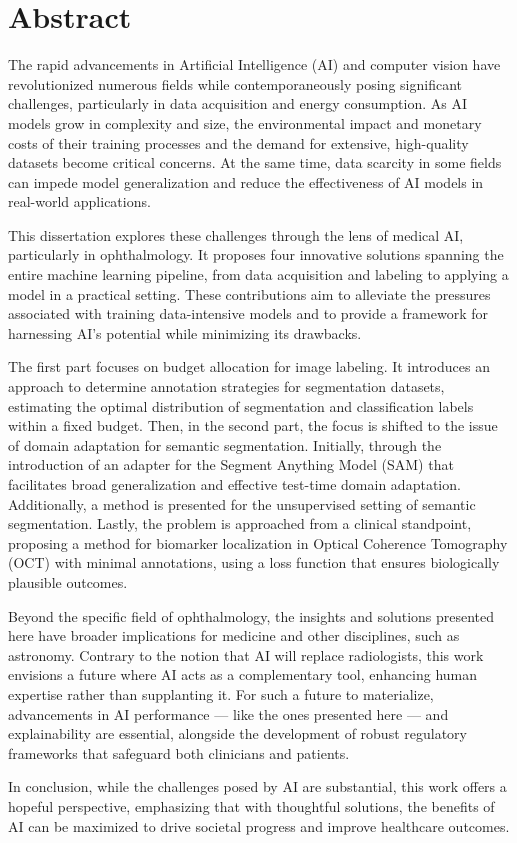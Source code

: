 \chapter*{Abstract}
The rapid advancements in Artificial Intelligence (AI) and computer vision have revolutionized numerous fields while contemporaneously posing significant challenges, particularly in data acquisition and energy consumption. As AI models grow in complexity and size, the environmental impact and monetary costs of their training processes and the demand for extensive, high-quality datasets become critical concerns. At the same time, data scarcity in some fields can impede model generalization and reduce the effectiveness of AI models in real-world applications. 

This dissertation explores these challenges through the lens of medical AI, particularly in ophthalmology. It proposes four innovative solutions spanning the entire machine learning pipeline, from data acquisition and labeling to applying a model in a practical setting. These contributions aim to alleviate the pressures associated with training data-intensive models and to provide a framework for harnessing AI's potential while minimizing its drawbacks.

The first part focuses on budget allocation for image labeling. It introduces an approach to determine annotation strategies for segmentation datasets, estimating the optimal distribution of segmentation and classification labels within a fixed budget. Then, in the second part, the focus is shifted to the issue of domain adaptation for semantic segmentation. Initially, through the introduction of an adapter for the Segment Anything Model (SAM) that facilitates broad generalization and effective test-time domain adaptation. Additionally, a method is presented for the unsupervised setting of semantic segmentation. Lastly, the problem is approached from a clinical standpoint, proposing a method for biomarker localization in Optical Coherence Tomography (OCT) with minimal annotations, using a loss function that ensures biologically plausible outcomes.


Beyond the specific field of ophthalmology, the insights and solutions presented here have broader implications for medicine and other disciplines, such as astronomy. Contrary to the notion that AI will replace radiologists, this work envisions a future where AI acts as a complementary tool, enhancing human expertise rather than supplanting it. For such a future to materialize, advancements in AI performance --- like the ones presented here --- and explainability are essential, alongside the development of robust regulatory frameworks that safeguard both clinicians and patients.

In conclusion, while the challenges posed by AI are substantial, this work offers a hopeful perspective, emphasizing that with thoughtful solutions, the benefits of AI can be maximized to drive societal progress and improve healthcare outcomes.

